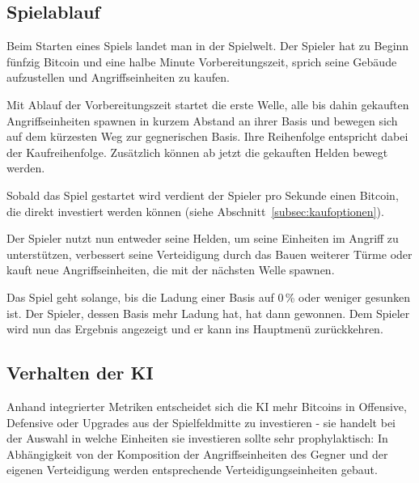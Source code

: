 \subsection{Spielablauf}

Beim Starten eines Spiels landet man in der Spielwelt. Der Spieler hat zu
Beginn fünfzig Bitcoin und eine halbe Minute Vorbereitungszeit, sprich seine
Gebäude aufzustellen und Angriffseinheiten zu kaufen.

Mit Ablauf der Vorbereitungszeit startet die erste Welle, alle bis dahin
gekauften Angriffseinheiten spawnen in kurzem Abstand an ihrer Basis und
bewegen sich auf dem kürzesten Weg zur gegnerischen Basis. Ihre Reihenfolge
entspricht dabei der Kaufreihenfolge. Zusätzlich können ab jetzt die gekauften
Helden bewegt werden.

Sobald das Spiel gestartet wird verdient der Spieler pro Sekunde einen Bitcoin,
die direkt investiert werden können (siehe
Abschnitt~\ref{subsec:kaufoptionen}).

Der Spieler nutzt nun entweder seine Helden, um seine Einheiten im Angriff zu
unterstützen, verbessert seine Verteidigung durch das Bauen weiterer Türme oder
kauft neue Angriffseinheiten, die mit der nächsten Welle spawnen.

Das Spiel geht solange, bis die Ladung einer Basis auf 0\,\% oder weniger
gesunken ist. Der Spieler, dessen Basis mehr Ladung hat, hat dann gewonnen. Dem
Spieler wird nun das Ergebnis angezeigt und er kann ins Hauptmenü zurückkehren.

\subsection{Verhalten der KI}
Anhand integrierter Metriken entscheidet sich die KI mehr Bitcoins in Offensive, Defensive oder Upgrades aus der Spielfeldmitte zu investieren - sie
handelt bei der Auswahl in welche Einheiten sie investieren sollte sehr prophylaktisch: 
In Abhängigkeit von der Komposition der Angriffseinheiten des Gegner und der eigenen
Verteidigung werden entsprechende Verteidigungseinheiten gebaut.
